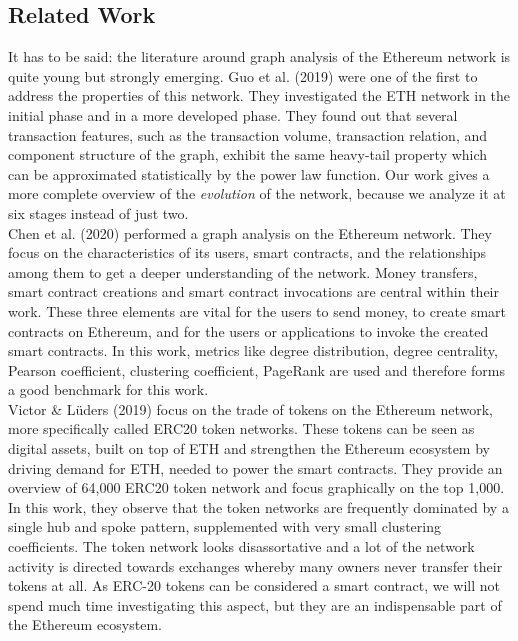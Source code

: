 \documentclass[10pt,a4paper]{article}
\begin{document}
\begin{multicols}{2}
\section{Related Work}
It has to be said: the literature around graph analysis of the Ethereum network is quite young but strongly emerging. Guo et al. (2019) \cite{GUO201958} were one of the first to address the properties of this network. They investigated the ETH network in the initial phase and in a more developed phase. They found out that several transaction features, such as the transaction volume, transaction relation, and component structure of the graph, exhibit the same heavy-tail property which can be approximated statistically by the power law function. Our work gives a more complete overview of the \textit{evolution} of the network, because we analyze it at six stages instead of just two.\\
Chen et al. (2020) \cite{chenEthereum} performed a graph analysis on the Ethereum network. They focus on the characteristics of its users, smart contracts, and the relationships among them to get a deeper understanding of the network. Money transfers, smart contract creations and smart contract invocations are central within their work. These three elements are vital for the users to send money, to create smart contracts on Ethereum, and for the users or applications to invoke the created smart contracts. In this work, metrics like degree distribution, degree centrality, Pearson coefficient, clustering coefficient, PageRank are used and therefore forms a good benchmark for this work.\\
Victor \& Lüders (2019) \cite{inbook} focus on the trade of tokens on the Ethereum network, more specifically called ERC20 token networks. These tokens can be seen as digital assets, built on top of ETH and strengthen the Ethereum ecosystem by driving demand for ETH, needed to power the smart contracts. They provide an overview of 64,000 ERC20 token network and focus graphically on the top 1,000. In this work, they observe that the token networks are frequently dominated by a single hub and spoke pattern, supplemented with very small clustering coefficients. The token network looks disassortative and a lot of the network activity is directed towards exchanges whereby many owners never transfer their tokens at all. As ERC-20 tokens can be considered a smart contract, we will not spend much time investigating this aspect, but they are an indispensable part of the Ethereum ecosystem.



\end{multicols}
\end{document}
